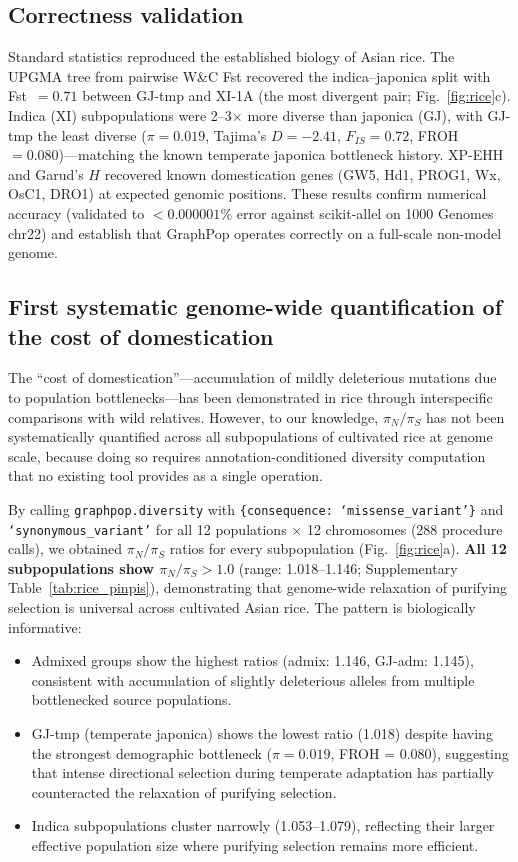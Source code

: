 \subsection*{Correctness validation}

Standard statistics reproduced the established biology of Asian rice. The UPGMA tree from pairwise W\&C Fst recovered the indica--japonica split with Fst~$= 0.71$ between GJ-tmp and XI-1A (the most divergent pair; Fig.~\ref{fig:rice}c). Indica (XI) subpopulations were 2--3$\times$ more diverse than japonica (GJ), with GJ-tmp the least diverse ($\pi = 0.019$, Tajima's $D = -2.41$, $F_{IS} = 0.72$, FROH~$= 0.080$)---matching the known temperate japonica bottleneck history. XP-EHH and Garud's $H$ recovered known domestication genes (GW5, Hd1, PROG1, Wx, OsC1, DRO1) at expected genomic positions. These results confirm numerical accuracy (validated to $< 0.000001\%$ error against scikit-allel on 1000 Genomes chr22) and establish that GraphPop operates correctly on a full-scale non-model genome.

\subsection*{First systematic genome-wide quantification of the cost of domestication}

The ``cost of domestication''---accumulation of mildly deleterious mutations due to population bottlenecks---has been demonstrated in rice through interspecific comparisons with wild relatives\cite{lu2006cost}. However, to our knowledge, $\pi_N/\pi_S$ has not been systematically quantified across all subpopulations of cultivated rice at genome scale, because doing so requires annotation-conditioned diversity computation that no existing tool provides as a single operation.

By calling \texttt{graphpop.diversity} with \texttt{\{consequence: `missense\_variant'\}} and \texttt{`synonymous\_variant'} for all 12 populations $\times$ 12 chromosomes (288 procedure calls), we obtained $\pi_N/\pi_S$ ratios for every subpopulation (Fig.~\ref{fig:rice}a). \textbf{All 12 subpopulations show $\pi_N/\pi_S > 1.0$} (range: 1.018--1.146; Supplementary Table~\ref{tab:rice_pinpis}), demonstrating that genome-wide relaxation of purifying selection is universal across cultivated Asian rice. The pattern is biologically informative:

\begin{itemize}
\item Admixed groups show the highest ratios (admix: 1.146, GJ-adm: 1.145), consistent with accumulation of slightly deleterious alleles from multiple bottlenecked source populations.
\item GJ-tmp (temperate japonica) shows the lowest ratio (1.018) despite having the strongest demographic bottleneck ($\pi = 0.019$, FROH = 0.080), suggesting that intense directional selection during temperate adaptation has partially counteracted the relaxation of purifying selection.
\item Indica subpopulations cluster narrowly (1.053--1.079), reflecting their larger effective population size where purifying selection remains more efficient.
\end{itemize}

